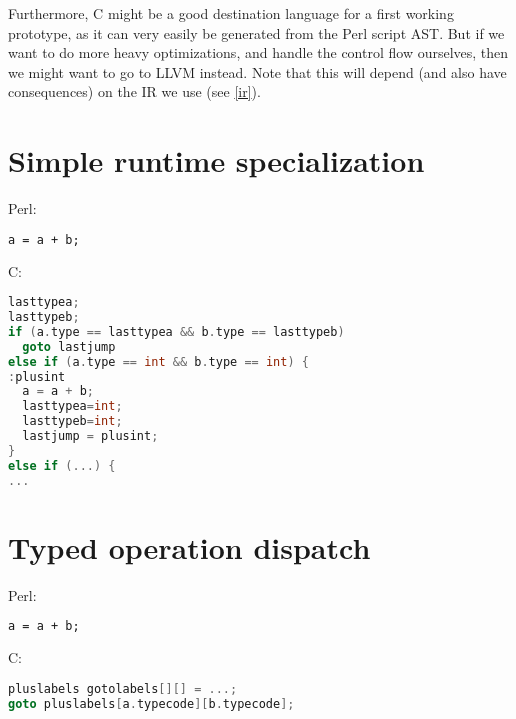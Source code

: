 \documentclass[11pt,a4paper]{report}
\begin{document}
Furthermore, C might be a good destination language for a first working prototype, as it can very easily be generated from the Perl script AST. But if we want to do more heavy optimizations, and handle the control flow ourselves, then we might want to go to LLVM instead. Note that this will depend (and also have consequences) on the IR we use (see \ref{ir}).

\section{Simple runtime specialization}


Perl:
\begin{lstlisting}[language=perl]
a = a + b;
\end{lstlisting}

C:
\begin{lstlisting}[language=C]
lasttypea;
lasttypeb;
if (a.type == lasttypea && b.type == lasttypeb)
  goto lastjump
else if (a.type == int && b.type == int) {
:plusint
  a = a + b;
  lasttypea=int;
  lasttypeb=int;
  lastjump = plusint;
}
else if (...) {	
...
\end{lstlisting}

\section{Typed operation dispatch}


Perl:
\begin{lstlisting}[language=perl]
a = a + b;
\end{lstlisting}

C:
\begin{lstlisting}[language=C]
pluslabels gotolabels[][] = ...;
goto pluslabels[a.typecode][b.typecode];
\end{lstlisting}
\end{document}
